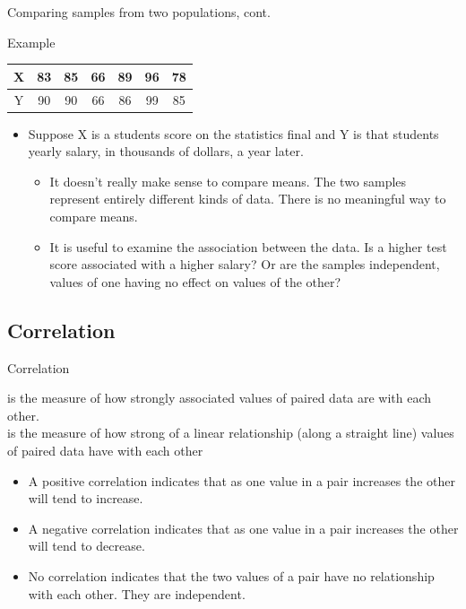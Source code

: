 \documentclass[xcolor=table]{beamer}
\begin{document}
\begin{frame}{Comparing samples from two populations, cont.}
\begin{exampleblock}{Example}
\smallskip
{\centering
\begin{tabular}{c | c c c c c c}
X & 83 & 85 & 66 & 89 & 96 & 78\\
\hline
Y & 90 & 90 & 66 & 86 & 99 & 85
\end{tabular}
\par}
\medskip
\begin{itemize}
\item Suppose X is a students score on the statistics final and Y is that students yearly salary, in thousands of dollars, a year later.
\begin{itemize}
\pause\item It doesn't really make sense to compare means. The two samples represent entirely different kinds of data. There is no meaningful way to compare means.
\pause\item It is useful to examine the association between the data. Is a higher test score associated with a higher salary? Or are the samples independent, values of one having no effect on values of the other?
\end{itemize}
\end{itemize}

\end{exampleblock}
\end{frame}

\setcounter{subsection}{1}
\subsection{Correlation}

\begin{frame}{Correlation}
\begin{block}{}
\large
{} is the measure of how strongly associated values of paired data are with each other.\\
\pause\medskip
{} is the measure of how strong of a linear relationship (along a straight line)  values of paired data have with each other 
\begin{itemize}
\pause\item A positive correlation indicates that as one value in a pair increases the other will tend to increase.
\pause\item A negative correlation indicates that as one value in a pair increases the other will tend to decrease.
\pause\item No correlation indicates that the two values of a pair have no relationship with each other. They are independent.
\end{itemize}
\end{block}
\end{frame}
\end{document}
